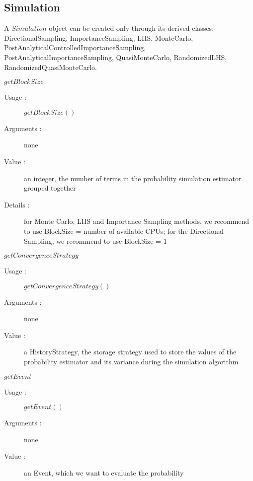 \newpage \subsection{Simulation}


\begin{description}
\item[Usage :] A $Simulation$ object can be created only through its derived classes:  DirectionalSampling, ImportanceSampling, LHS, MonteCarlo, PostAnalyticalControlledImportanceSampling, PostAnalyticalImportanceSampling, QuasiMonteCarlo, RandomizedLHS, RandomizedQuasiMonteCarlo.

\item[Some methods :]  \rule{0pt}{1em}

  \begin{description}

  \item $getBlockSize$
    \begin{description}
    \item[Usage :] $getBlockSize()$
    \item[Arguments :] none
    \item[Value :]  an integer, the number of terms in the probability simulation estimator grouped together
    \item[Details :]  for Monte Carlo, LHS and Importance Sampling methods, we recommend to use BlockSize = number of available CPUs; for the Directional Sampling, we recommend to use BlockSize = 1
    \end{description}
    \bigskip

  \item $getConvergenceStrategy$
    \begin{description}
    \item[Usage :] $getConvergenceStrategy()$
    \item[Arguments :] none
    \item[Value :]  a HistoryStrategy, the storage strategy used to store the values of the probability estimator and its variance
      during the simulation algorithm
    \end{description}
    \bigskip

  \item $getEvent$
    \begin{description}
    \item[Usage :] $getEvent()$
    \item[Arguments :] none
    \item[Value :]  an Event, which we want to evaluate the probability
    \end{description}
    \bigskip


\end{description}
\end{description}
